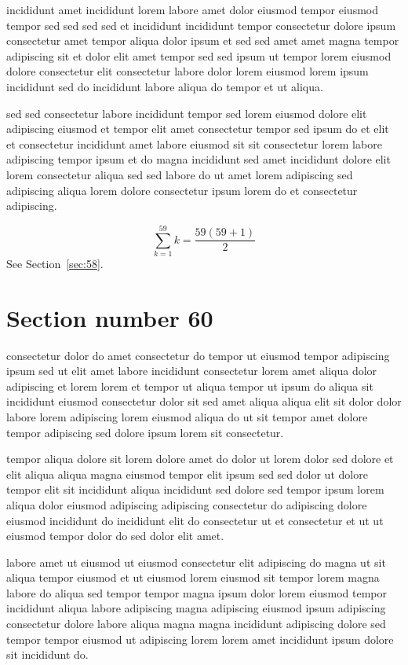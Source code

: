 \documentclass{article}
\begin{document}
incididunt amet incididunt lorem labore amet dolor eiusmod tempor eiusmod tempor sed sed sed sed et incididunt incididunt tempor consectetur dolore ipsum consectetur amet tempor aliqua dolor ipsum et sed sed amet amet magna tempor adipiscing sit et dolor elit amet tempor sed sed ipsum ut tempor lorem eiusmod dolore consectetur elit consectetur labore dolor lorem eiusmod lorem ipsum incididunt sed do incididunt labore aliqua do tempor et ut aliqua.

sed sed consectetur labore incididunt tempor sed lorem eiusmod dolore elit adipiscing eiusmod et tempor elit amet consectetur tempor sed ipsum do et elit et consectetur incididunt amet labore eiusmod sit sit consectetur lorem labore adipiscing tempor ipsum et do magna incididunt sed amet incididunt dolore elit lorem consectetur aliqua sed sed labore do ut amet lorem adipiscing sed adipiscing aliqua lorem dolore consectetur ipsum lorem do et consectetur adipiscing.

\begin{equation} \sum_{k=1}^{59} k = \frac{59(59+1)}{2} \end{equation}
See Section~\ref{sec:58}.

\section{Section number 60}\label{sec:60}
consectetur dolor do amet consectetur do tempor ut eiusmod tempor adipiscing ipsum sed ut elit amet labore incididunt consectetur lorem amet aliqua dolor adipiscing et lorem lorem et tempor ut aliqua tempor ut ipsum do aliqua sit incididunt eiusmod consectetur dolor sit sed amet aliqua aliqua elit sit dolor dolor labore lorem adipiscing lorem eiusmod aliqua do ut sit tempor amet dolore tempor adipiscing sed dolore ipsum lorem sit consectetur.

tempor aliqua dolore sit lorem dolore amet do dolor ut lorem dolor sed dolore et elit aliqua aliqua magna eiusmod tempor elit ipsum sed sed dolor ut dolore tempor elit sit incididunt aliqua incididunt sed dolore sed tempor ipsum lorem aliqua dolor eiusmod adipiscing adipiscing consectetur do adipiscing dolore eiusmod incididunt do incididunt elit do consectetur ut et consectetur et ut ut eiusmod tempor dolor do sed dolor elit amet.

labore amet ut eiusmod ut eiusmod consectetur elit adipiscing do magna ut sit aliqua tempor eiusmod et ut eiusmod lorem eiusmod sit tempor lorem magna labore do aliqua sed tempor tempor magna ipsum dolor lorem eiusmod tempor incididunt aliqua labore adipiscing magna adipiscing eiusmod ipsum adipiscing consectetur dolore labore aliqua magna magna incididunt adipiscing dolore sed tempor tempor eiusmod ut adipiscing lorem lorem amet incididunt ipsum dolore sit incididunt do.
\end{document}
